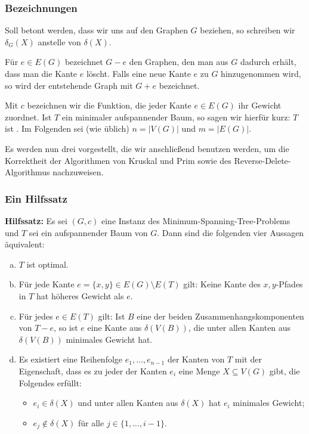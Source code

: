 \documentclass[smaller]{beamer}
\begin{document}
\begin{frame}
\frametitle{Bezeichnungen}
Soll betont werden, dass wir uns auf den Graphen $G$ beziehen, so schreiben wir $\delta_G(X)$ anstelle von $\delta(X)$. \\ \vspace*{0.2cm}

Für $e \in E(G)$ bezeichnet $G-e$ den Graphen, den man aus $G$ dadurch erhält, dass man die Kante $e$ löscht. Falls eine neue Kante $e$ zu $G$ hinzugenommen wird, so wird der entstehende Graph mit $G+e$ bezeichnet. \\ \vspace*{0.2cm}

Mit $c$ bezeichnen wir die Funktion, die jeder Kante $e \in E(G)$ ihr Gewicht zuordnet. Ist $T$ ein minimaler aufspannender Baum, so sagen wir hierfür kurz: $T$ ist . Im Folgenden sei (wie üblich) $n = |V(G)|$ und $m=|E(G)|$. \\ \vspace*{0.2cm}

Es werden nun drei  vorgestellt, die wir anschließend benutzen werden, um die Korrektheit der Algorithmen von Kruskal und Prim sowie des Reverse-Delete-Algorithmus nachzuweisen.
\end{frame}

\begin{frame}
\frametitle{Ein Hilfssatz}
 \textbf{Hilfssatz:} Es sei $(G,c)$ eine Instanz des Minimum-Spanning-Tree-Problems und $T$ sei ein aufspannender Baum von $G$. \alert{Dann sind die folgenden vier Aussagen äquivalent:}
	\begin{enumerate}[a)]
		\item $T$ ist optimal.
		
		\item Für jede Kante $e = \big\{ x,y \big\} \in E(G) \setminus E(T)$ gilt: Keine Kante des $x,y$-Pfades in $T$ hat höheres Gewicht als $e$.
		
		\item Für jedes $e \in E(T)$ gilt: Ist $B$ eine der beiden Zusammenhangskomponenten von $T-e$, so ist $e$ eine Kante aus $\delta(V(B))$, die unter allen Kanten aus $\delta(V(B))$ minimales Gewicht hat.
		
		\item Es existiert eine Reihenfolge $e_1,\ldots,e_{n-1}$ der Kanten von $T$ mit der Eigenschaft, dass es zu jeder der Kanten $e_i$ eine Menge $X \subseteq V(G)$ gibt, die Folgendes erfüllt:
		\begin{itemize}
			\item $e_i \in \delta(X)$ und unter allen Kanten aus $\delta(X)$ hat $e_i$ minimales Gewicht;
			
			\item $e_j \notin \delta(X)$ für alle $j \in \big\{ 1,\ldots, i-1\big\}$. 
		\end{itemize}
	\end{enumerate}
\end{frame}
\end{document}
